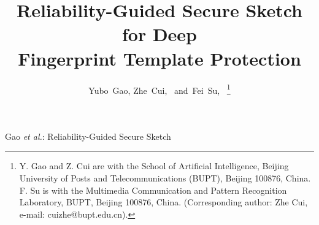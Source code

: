 \documentclass[journal]{IEEEtran}
\begin{document}

\title{Reliability-Guided Secure Sketch for Deep\\
       Fingerprint Template Protection}

\author{Yubo~Gao,
        Zhe~Cui,~
        and~Fei~Su,~%
\thanks{Y. Gao and Z. Cui are with the School of Artificial Intelligence,
  Beijing University of Posts and Telecommunications (BUPT),
  Beijing 100876, China.
  F. Su is with the Multimedia Communication and Pattern Recognition
  Laboratory, BUPT, Beijing 100876, China.
  (Corresponding author: Zhe Cui, e-mail: cuizhe@bupt.edu.cn).}%
}

%
{Gao \MakeLowercase{\textit{et al.}}: Reliability-Guided Secure Sketch}

\maketitle
\end{document}

